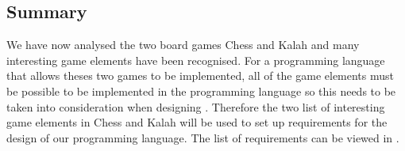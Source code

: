 \subsection{Summary}
\label{subsec:summery}

We have now analysed the two board games Chess and Kalah and many interesting game elements have been recognised. For a programming language that allows theses two games to be implemented, all of the game elements must be possible to be implemented in the programming language so this needs to be taken into consideration when designing \productname{}. Therefore the two list of interesting game elements in Chess and Kalah will be used to set up requirements for the design of our programming language. The list of requirements can be viewed in .


 
